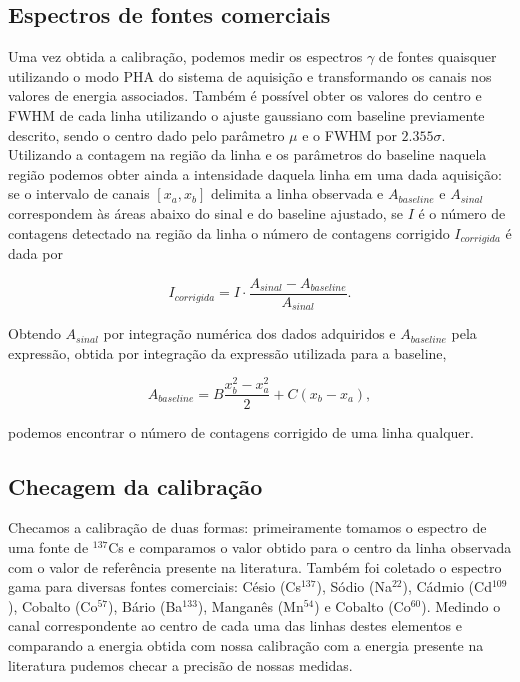 \documentclass[a4paper, 11pt, notitlepage]{article}
\numberwithin{equation}{section}  %
\begin{document}
\subsection{Espectros de fontes comerciais\label{sec:espectro.comercial}}
Uma vez obtida a calibração, podemos medir os espectros $\gamma$ de fontes quaisquer utilizando o modo PHA do sistema de aquisição e transformando os canais nos valores de energia associados. Também é possível obter os valores do centro e FWHM de cada linha utilizando o ajuste gaussiano com baseline previamente descrito, sendo o centro dado pelo parâmetro $\mu$ e o FWHM por $2.355 \sigma$. Utilizando a contagem na região da linha e os parâmetros do baseline naquela região podemos obter ainda a intensidade daquela linha em uma dada aquisição: se o intervalo de canais $[x_a, x_b]$ delimita a linha observada e $A_{baseline}$ e $A_{sinal}$ correspondem às áreas abaixo do sinal e do baseline ajustado, se $I$ é o número de contagens detectado na região da linha o número de contagens corrigido $I_{corrigida}$ é dada por

\begin{equation*}
  I_{corrigida} = I \cdot \frac{A_{sinal} - A_{baseline}}{A_{sinal}}.
\end{equation*}

Obtendo $A_{sinal}$ por integração numérica dos dados adquiridos e $A_{baseline}$ pela expressão, obtida por integração da expressão utilizada para a baseline,

\begin{equation*}
  A_{baseline} = B \frac{x_b^2 - x_a^2}{2} + C\left(x_b - x_a\right),
\end{equation*}

\noindent podemos encontrar o número de contagens corrigido de uma linha qualquer.

\subsection{Checagem da calibração}
Checamos a calibração de duas formas: primeiramente tomamos o espectro de uma fonte de ${}^{137}$Cs e comparamos o valor obtido para o centro da linha observada com o valor de referência presente na literatura. Também foi coletado o espectro gama para diversas fontes comerciais: Césio (Cs$^{137}$), Sódio (Na$^{22}$), Cádmio (Cd$^{109}$), Cobalto (Co$^{57}$), Bário (Ba$^{133}$), Manganês (Mn$^{54}$) e Cobalto (Co$^{60}$).  Medindo o canal correspondente ao centro de cada uma das linhas destes elementos e comparando a energia obtida com nossa calibração com a energia presente na literatura pudemos checar a precisão de nossas medidas.
\end{document}
